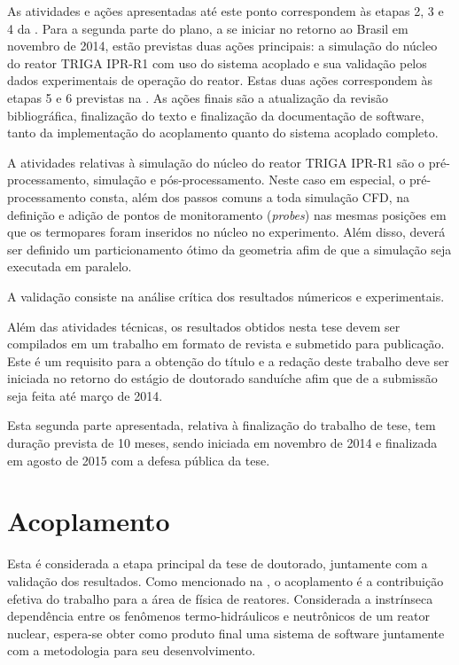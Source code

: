\documentclass[12pt,openright,twoside,a4paper,english,french,spanish,brazil]{abntex2}
\begin{document}
As atividades e ações apresentadas até este ponto correspondem às etapas 2, 3 e 4 da . 
Para a segunda parte do plano, a se iniciar no retorno ao Brasil em novembro de 2014, estão previstas duas 
ações principais: a simulação do núcleo do reator TRIGA IPR-R1 com uso do sistema acoplado e sua validação 
pelos dados experimentais de operação do reator. Estas duas ações correspondem às etapas 5 e 6 previstas 
na . As ações finais são a atualização da revisão bibliográfica, finalização do 
texto e finalização da documentação de software, tanto da implementação do acoplamento quanto do sistema 
acoplado completo.

A atividades relativas à simulação do núcleo do reator TRIGA IPR-R1 são o pré-processamento, simulação 
e pós-processamento. Neste caso em especial, o pré-processamento consta, além dos passos comuns a toda 
simulação CFD, na definição e adição de pontos de monitoramento (\textit{probes}) nas mesmas posições 
em que os termopares foram inseridos no núcleo no experimento. Além disso, deverá ser definido um particionamento 
ótimo da geometria afim de que a simulação seja executada em paralelo. 

A validação consiste na análise crítica dos resultados númericos e experimentais.

Além das atividades técnicas, os resultados obtidos nesta tese devem ser compilados em um trabalho em formato de revista 
e submetido para publicação. Este é um requisito para a obtenção do título e a redação deste trabalho deve 
ser iniciada no retorno do estágio de doutorado sanduíche afim que de a submissão seja feita até março 
de 2014. 

Esta segunda parte apresentada, relativa à finalização do trabalho de tese, tem duração prevista de 10 meses, sendo 
iniciada em novembro de 2014 e finalizada em agosto de 2015 com a defesa pública da tese. 




\part{ Acoplamento}

Esta é considerada a etapa principal da tese de doutorado, juntamente com a validação dos resultados. Como mencionado 
na , o acoplamento é a contribuição efetiva do trabalho para a área de física de reatores. Considerada  
a instrínseca dependência entre os fenômenos termo-hidráulicos e neutrônicos de um reator nuclear, espera-se obter como 
produto final uma sistema de software juntamente com a metodologia para seu desenvolvimento.
\end{document}
